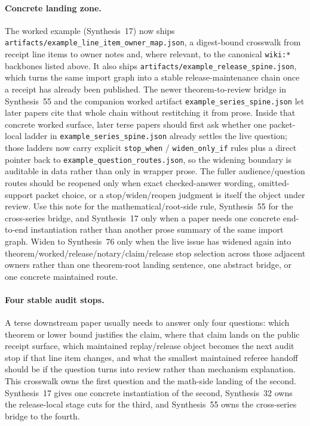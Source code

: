 \documentclass[11pt]{article}
\begin{document}
\paragraph{Concrete landing zone.}
The worked example (Synthesis~17) now ships \texttt{artifacts/example\_line\_item\_owner\_map.json}, a digest-bound crosswalk from receipt line items to owner notes and, where relevant, to the canonical \texttt{wiki:*} backbones listed above.
It also ships \texttt{artifacts/example\_release\_spine.json}, which turns the same import graph into a stable release-maintenance chain once a receipt has already been published. The newer theorem-to-review bridge in Synthesis~55 and the companion worked artifact \texttt{example\_series\_spine.json} let later papers cite that whole chain without restitching it from prose. Inside that concrete worked surface, later terse papers should first ask whether one packet-local ladder in \texttt{example\_series\_spine.json} already settles the live question; those ladders now carry explicit \texttt{stop\_when} / \texttt{widen\_only\_if} rules plus a direct pointer back to \texttt{example\_question\_routes.json}, so the widening boundary is auditable in data rather than only in wrapper prose. The fuller audience/question routes should be reopened only when exact checked-answer wording, omitted-support packet choice, or a stop/widen/reopen judgment is itself the object under review.
Use this note for the mathematical/root-side rule, Synthesis~55 for the cross-series bridge, and Synthesis~17 only when a paper needs one concrete end-to-end instantiation rather than another prose summary of the same import graph. Widen to Synthesis~76 only when the live issue has widened again into theorem/worked/release/notary/claim/release stop selection across those adjacent owners rather than one theorem-root landing sentence, one abstract bridge, or one concrete maintained route.\cite{series:workedexample,series:seriesspines,series:theoremtopublicationspine}

\paragraph{Four stable audit stops.}
A terse downstream paper usually needs to answer only four questions: which theorem or lower bound justifies the claim, where that claim lands on the public receipt surface, which maintained replay/release object becomes the next audit stop if that line item changes, and what the smallest maintained referee handoff should be if the question turns into review rather than mechanism explanation. This crosswalk owns the first question and the math-side landing of the second. Synthesis~17 gives one concrete instantiation of the second, Synthesis~32 owns the release-local stage cuts for the third, and Synthesis~55 owns the cross-series bridge to the fourth.\cite{series:workedexample,series:releasespine,series:seriesspines}
\end{document}
